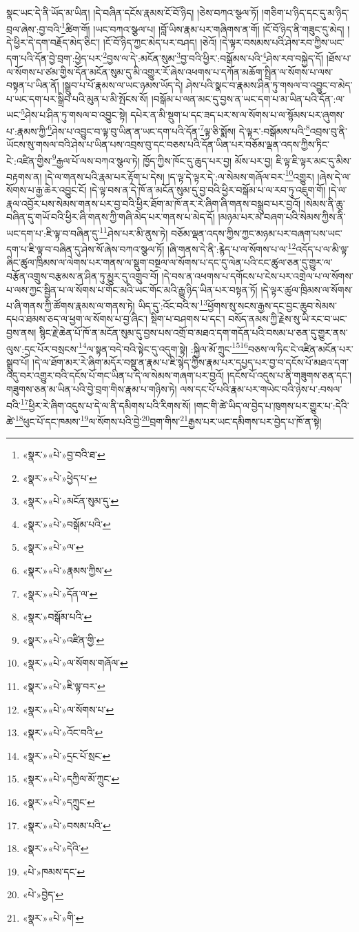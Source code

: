 སྣང་ཡང་དེ་ནི་ཡོད་མ་ཡིན། །དེ་བཞིན་དངོས་རྣམས་ངོ་བོ་ཉིད། །ཅེས་བཀའ་སྩལ་ཏོ། །གཅིག་པ་ཉིད་དང་དུ་མ་ཉིད་བྲལ་ཞེས་:བྱ་བའི་\footnote{«སྣར་»«པེ་»བྱ་བའི་ཐ་}ཚིག་གོ། །ཡང་བཀའ་སྩལ་པ། །བློ་ཡིས་རྣམ་པར་གཞིགས་ན་གོ། །ངོ་བོ་ཉིད་ནི་གཟུང་དུ་མེད། །དེ་ཕྱིར་དེ་དག་བརྗོད་མེད་ཅིང་། །ངོ་བོ་ཉིད་ཀྱང་མེད་པར་བཤད། །ཅེའོ། །དེ་ལྟར་བསམས་པའི་ཤེས་རབ་ཀྱིས་ཡང་དག་པའི་དོན་བྱེ་བྲག་:ཕྱེད་པར་\footnote{«སྣར་»«པེ་»ཕྱེད་པ་}བྱས་ལ་དེ་:མངོན་སུམ་\footnote{«སྣར་»«པེ་»མངོན་སུམ་དུ་}བྱ་བའི་ཕྱིར་:བསྒོམས་པའི་\footnote{«སྣར་»«པེ་»བསྒོམ་པའི་}ཤེས་རབ་བསྐྱེད་དོ། །ཐོས་པ་ལ་སོགས་པ་ཙམ་གྱིས་དོན་མངོན་སུམ་དུ་མི་འགྱུར་རོ་ཞེས་འཕགས་པ་དཀོན་མཆོག་སྤྲིན་ལ་སོགས་པ་ལས་བསྟན་པ་ཡིན་ནོ། །སྒྲུབ་པ་པོ་རྣམས་ལ་ཡང་ཉམས་ཡོད་དེ། ཤེས་པའི་སྣང་བ་རྣམས་ཤིན་ཏུ་གསལ་བ་འབྱུང་བ་མེད་པ་ཡང་དག་པར་སྒྲིབ་པའི་མུན་པ་མི་སྤོངས་སོ། །བསྒོམ་པ་ལན་མང་དུ་བྱས་ན་ཡང་དག་པ་མ་ཡིན་པའི་དོན་:ལ་ཡང་\footnote{«སྣར་»«པེ་»ལ་}ཤེས་པ་ཤིན་ཏུ་གསལ་བ་འབྱུང་སྟེ། དཔེར་ན་མི་སྡུག་པ་དང་ཟད་པར་ས་ལ་སོགས་པ་ལ་སྙོམས་པར་ཞུགས་པ་:རྣམས་ཀྱི་\footnote{«སྣར་»«པེ་»རྣམས་ཀྱིས་}ཤེས་པ་འབྱུང་བ་ལྟ་བུ་ཡིན་ན་ཡང་དག་པའི་དོན་\footnote{«སྣར་»«པེ་»དོན་ལ་}ལྟ་ཅི་སྨོས། དེ་ལྟར་:བསྒོམས་པའི་\footnote{«སྣར་»བསྒོམ་པའི་}འབྲས་བུ་ནི་ཡོངས་སུ་གསལ་བའི་ཤེས་པ་ཡིན་པས་འབྲས་བུ་དང་བཅས་པའི་དོན་ཡིན་པར་བཅོམ་ལྡན་འདས་ཀྱིས་ཏིང་ངེ་:འཛིན་གྱིས་\footnote{«སྣར་»«པེ་»འཛིན་གྱི་}རྒྱལ་པོ་ལས་བཀའ་སྩལ་ཏེ། ཁྱོད་ཀྱིས་ཁོང་དུ་ཆུད་པར་བྱ། མོས་པར་བྱ། ཇི་ལྟ་ཇི་ལྟར་མང་དུ་མིས་བརྟགས་ན། །དེ་ལ་གནས་པའི་རྣམ་པར་རྟོག་པ་དེས། །ད་ལྟ་དེ་ལྟར་དེ་:ལ་སེམས་གཞོལ་བར་\footnote{«སྣར་»«པེ་»ལ་སོགས་གཞོལ་}འགྱུར། །ཞེས་དེ་ལ་སོགས་པ་རྒྱ་ཆེར་འབྱུང་ངོ། །དེ་ལྟ་བས་ན་དེ་ཁོ་ན་མངོན་སུམ་དུ་བྱ་བའི་ཕྱིར་བསྒོམ་པ་ལ་རབ་ཏུ་འཇུག་གོ། །དེ་ལ་རྣལ་འབྱོར་པས་སེམས་གནས་པར་བྱ་བའི་ཕྱིར་ཐོག་མ་ཁོ་ནར་རེ་ཞིག་ཞི་གནས་བསྒྲུབ་པར་བྱའོ། །སེམས་ནི་ཆུ་བཞིན་དུ་གཡོ་བའི་ཕྱིར་ཞི་གནས་ཀྱི་གཞི་མེད་པར་གནས་པ་མེད་དོ། །མཉམ་པར་མ་བཞག་པའི་སེམས་ཀྱིས་ནི་ཡང་དག་པ་:ཇི་ལྟ་བ་བཞིན་དུ་\footnote{«སྣར་»«པེ་»ཇི་ལྟ་བར་}ཤེས་པར་མི་ནུས་ཏེ། བཅོམ་ལྡན་འདས་ཀྱིས་ཀྱང་མཉམ་པར་བཞག་པས་ཡང་དག་པ་ཇི་ལྟ་བ་བཞིན་དུ་ཤེས་སོ་ཞེས་བཀའ་སྩལ་ཏོ། །ཞི་གནས་དེ་ནི་:རྙེད་པ་ལ་སོགས་པ་ལ་\footnote{«སྣར་»«པེ་»ལ་སོགས་པ་}འདོད་པ་ལ་མི་ལྟ་ཞིང་ཚུལ་ཁྲིམས་ལ་ལེགས་པར་གནས་ལ་སྡུག་བསྔལ་ལ་སོགས་པ་དང་དུ་ལེན་པའི་ངང་ཚུལ་ཅན་དུ་གྱུར་ལ་བརྩོན་འགྲུས་བརྩམས་ན་ཤིན་ཏུ་མྱུར་དུ་འགྲུབ་བོ། །དེ་བས་ན་འཕགས་པ་དགོངས་པ་ངེས་པར་འགྲེལ་པ་ལ་སོགས་པ་ལས་ཀྱང་སྦྱིན་པ་ལ་སོགས་པ་གོང་མའི་ཡང་གོང་མའི་རྒྱུ་ཉིད་ཡིན་པར་བསྟན་ཏོ། །དེ་ལྟར་ཚུལ་ཁྲིམས་ལ་སོགས་པ་ཞི་གནས་ཀྱི་ཚོགས་རྣམས་ལ་གནས་ཏེ། ཡིད་དུ་:འོང་བའི་ས་\footnote{«སྣར་»«པེ་»འོང་བའི་}ཕྱོགས་སུ་སངས་རྒྱས་དང་བྱང་ཆུབ་སེམས་དཔའ་ཐམས་ཅད་ལ་ཕྱག་ལ་སོགས་པ་བྱ་ཞིང་། སྡིག་པ་བཤགས་པ་དང་། བསོད་ནམས་ཀྱི་རྗེས་སུ་ཡི་རང་བ་ཡང་བྱས་ནས། སྙིང་རྗེ་ཆེན་པོ་ཁོ་ན་མངོན་སུམ་དུ་བྱས་པས་འགྲོ་བ་མཐའ་དག་གདོན་པའི་བསམ་པ་ཅན་དུ་གྱུར་ནས་ལུས་:དྲང་པོར་བསྲངས་\footnote{«སྣར་»«པེ་»དྲང་པོ་སྲང་}ལ་སྟན་བདེ་བའི་སྟེང་དུ་འདུག་སྟེ། :སྐྱིལ་མོ་ཀྲུང་\footnote{«སྣར་»«པེ་»དཀྱིལ་མོ་ཀྲུང་}\footnote{«སྣར་»«པེ་»དཀྲུང་}བཅས་ལ་ཏིང་ངེ་འཛིན་མངོན་པར་སྒྲུབ་པོ། །དེ་ལ་ཐོག་མར་རེ་ཞིག་མདོར་བསྡུ་ན་རྣམ་པ་ཇི་སྙེད་ཀྱིས་རྣམ་པར་དཔྱད་པར་བྱ་བ་དངོས་པོ་མཐའ་དག་འདུ་བར་འགྱུར་བའི་དངོས་པོ་གང་ཡིན་པ་དེ་ལ་སེམས་གཞག་པར་བྱའོ། །དངོས་པོ་འདུས་པ་ནི་གཟུགས་ཅན་དང་། གཟུགས་ཅན་མ་ཡིན་པའི་བྱེ་བྲག་གིས་རྣམ་པ་གཉིས་ཏེ། ལས་དང་པོ་པའི་རྣམ་པར་གཡེང་བའི་ཉེས་པ་:བསལ་བའི་\footnote{«སྣར་»«པེ་»བསམ་པའི་}ཕྱིར་རེ་ཞིག་འདུས་པ་དེ་ལ་ནི་དམིགས་པའི་རིགས་སོ། །གང་གི་ཚེ་ཡིད་ལ་བྱེད་པ་ཁུགས་པར་གྱུར་པ་:དེའི་ཚེ་\footnote{«སྣར་»«པེ་»དེའི་}ཕུང་པོ་དང་ཁམས་\footnote{«པེ་»ཁམས་དང་}ལ་སོགས་པའི་བྱེ་\footnote{«པེ་»བྱེད་}བྲག་གིས་\footnote{«སྣར་»«པེ་»གི་}རྒྱས་པར་ཡང་དམིགས་པར་བྱེད་པ་ཁོ་ན་སྟེ། 